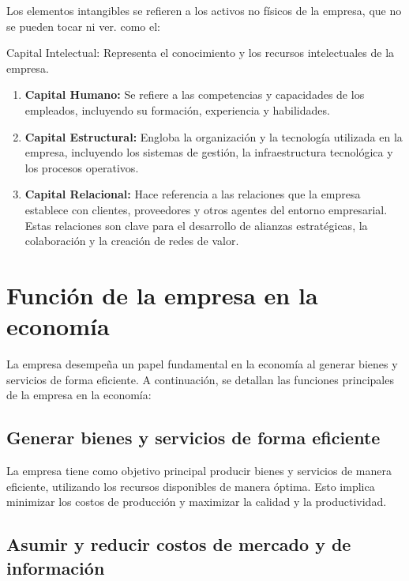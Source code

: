 \documentclass[
  man,
  floatsintext,
  longtable,
  a4paper,
  nolmodern,
  notxfonts,
  notimes,
  12pt,
  colorlinks=true,linkcolor=blue,citecolor=blue,urlcolor=blue]{apa7}
\begin{document}
Los elementos intangibles se refieren a los activos no físicos de la
empresa, que no se pueden tocar ni ver. como el:

Capital Intelectual: Representa el conocimiento y los recursos
intelectuales de la empresa.

\begin{enumerate}
\def\labelenumi{\alph{enumi}.}
\item
  \textbf{Capital Humano:} Se refiere a las competencias y capacidades
  de los empleados, incluyendo su formación, experiencia y habilidades.
\item
  \textbf{Capital Estructural:} Engloba la organización y la tecnología
  utilizada en la empresa, incluyendo los sistemas de gestión, la
  infraestructura tecnológica y los procesos operativos.
\item
  \textbf{Capital Relacional:} Hace referencia a las relaciones que la
  empresa establece con clientes, proveedores y otros agentes del
  entorno empresarial. Estas relaciones son clave para el desarrollo de
  alianzas estratégicas, la colaboración y la creación de redes de
  valor.
\end{enumerate}

\section{Función de la empresa en la
economía}\label{funciuxf3n-de-la-empresa-en-la-economuxeda}

La empresa desempeña un papel fundamental en la economía al generar
bienes y servicios de forma eficiente. A continuación, se detallan las
funciones principales de la empresa en la economía:

\subsection{Generar bienes y servicios de forma
eficiente}\label{generar-bienes-y-servicios-de-forma-eficiente}

La empresa tiene como objetivo principal producir bienes y servicios de
manera eficiente, utilizando los recursos disponibles de manera óptima.
Esto implica minimizar los costos de producción y maximizar la calidad y
la productividad.

\subsection{Asumir y reducir costos de mercado y de
información}\label{asumir-y-reducir-costos-de-mercado-y-de-informaciuxf3n}
\end{document}
